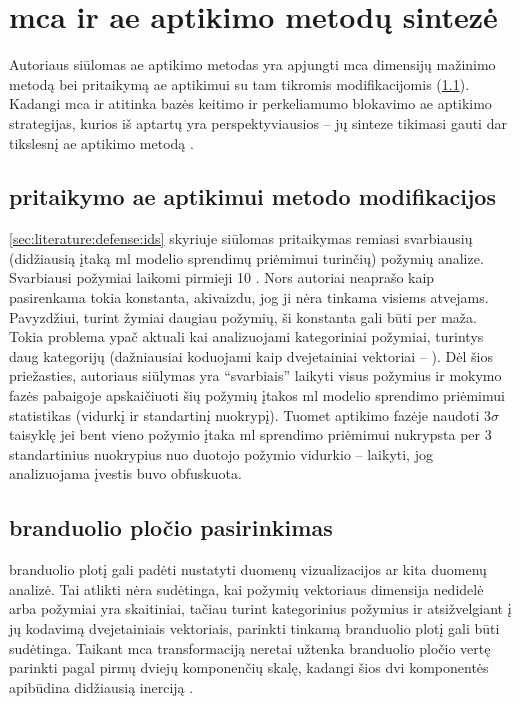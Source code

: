 \section{\gls{mca} ir \LIME \gls{ae} aptikimo metodų sintezė}\label{sec:method}

Autoriaus siūlomas \gls{ae} aptikimo metodas yra apjungti \gls{mca} dimensijų mažinimo metodą bei \LIME pritaikymą \gls{ae} aptikimui su tam tikromis modifikacijomis (\ref{sec:method:mods}). Kadangi \gls{mca} ir \LIME atitinka bazės keitimo  ir perkeliamumo blokavimo  \gls{ae} aptikimo strategijas, kurios iš aptartų yra perspektyviausios -- jų sinteze tikimasi gauti dar tikslesnį \gls{ae} aptikimo metodą .

\subsection{\LIME pritaikymo \gls{ae} aptikimui metodo modifikacijos}\label{sec:method:mods}
\ref{sec:literature:defense:ids} skyriuje siūlomas \LIME pritaikymas remiasi svarbiausių (didžiausią įtaką \gls{ml} modelio sprendimų priėmimui turinčių) požymių analize. Svarbiausi požymiai laikomi pirmieji 10 \cite{tcydenovaDetectionAdversarialAttacks2021}. Nors autoriai neaprašo kaip pasirenkama tokia konstanta, akivaizdu, jog ji nėra tinkama visiems atvejams. Pavyzdžiui, turint žymiai daugiau požymių, ši konstanta gali būti per maža. Tokia problema ypač aktuali kai analizuojami kategoriniai požymiai, turintys daug kategorijų (dažniausiai koduojami kaip dvejetainiai vektoriai -- ). Dėl šios priežasties, autoriaus siūlymas yra \enquote{svarbiais} laikyti visus požymius ir mokymo fazės pabaigoje apskaičiuoti šių požymių įtakos \gls{ml} modelio sprendimo priėmimui statistikas (vidurkį ir standartinį nuokrypį). Tuomet aptikimo fazėje naudoti $3 \sigma$ taisyklę \cite{pukelsheimThreeSigmaRule1994} \ty jei bent vieno požymio įtaka \gls{ml} sprendimo priėmimui nukrypsta per 3 standartinius nuokrypius nuo duotojo požymio vidurkio -- laikyti, jog analizuojama įvestis buvo obfuskuota.

\subsection{\LIME branduolio pločio pasirinkimas}

\LIME branduolio plotį  gali padėti nustatyti duomenų vizualizacijos ar kita duomenų analizė. Tai atlikti nėra sudėtinga, kai požymių vektoriaus dimensija nedidelė arba požymiai yra skaitiniai, tačiau turint kategorinius požymius ir atsižvelgiant į jų kodavimą dvejetainiais vektoriais, parinkti tinkamą \LIME branduolio plotį gali būti sudėtinga. Taikant \gls{mca} transformaciją neretai užtenka branduolio pločio vertę parinkti pagal pirmų dviejų komponenčių skalę, kadangi šios dvi komponentės apibūdina didžiausią inerciją .

